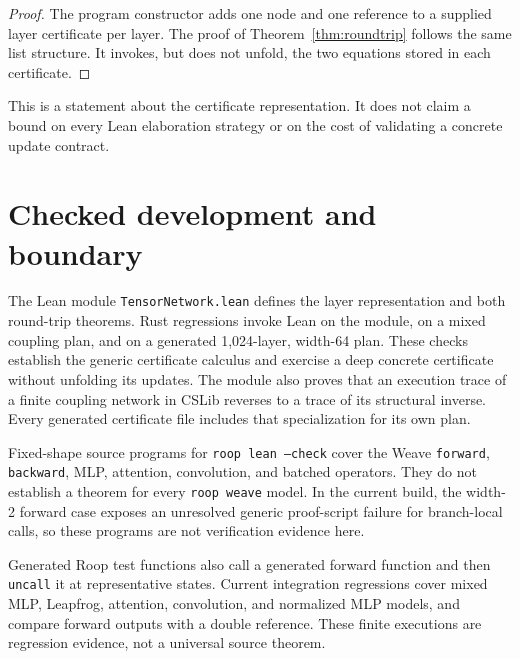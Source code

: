 \documentclass[aop,preprint]{../aop-template/imsart}
\theoremstyle{definition}
\begin{document}
\begin{proof}
The program constructor adds one node and one reference to a supplied layer certificate per layer. The proof of Theorem~\ref{thm:roundtrip} follows the same list structure. It invokes, but does not unfold, the two equations stored in each certificate.
\end{proof}

This is a statement about the certificate representation. It does not claim a bound on every Lean elaboration strategy or on the cost of validating a concrete update contract.

\section{Checked development and boundary}

The Lean module \texttt{TensorNetwork.lean} defines the layer representation and both round-trip theorems. Rust regressions invoke Lean on the module, on a mixed coupling plan, and on a generated 1,024-layer, width-64 plan. These checks establish the generic certificate calculus and exercise a deep concrete certificate without unfolding its updates. The module also proves that an execution trace of a finite coupling network in CSLib reverses to a trace of its structural inverse. Every generated certificate file includes that specialization for its own plan.

Fixed-shape source programs for \texttt{roop lean --check} cover the Weave \texttt{forward}, \texttt{backward}, MLP, attention, convolution, and batched operators. They do not establish a theorem for every \texttt{roop weave} model. In the current build, the width-2 forward case exposes an unresolved generic proof-script failure for branch-local calls, so these programs are not verification evidence here.

Generated Roop test functions also call a generated forward function and then \texttt{uncall} it at representative states. Current integration regressions cover mixed MLP, Leapfrog, attention, convolution, and normalized MLP models, and compare forward outputs with a double reference. These finite executions are regression evidence, not a universal source theorem.
\end{document}
